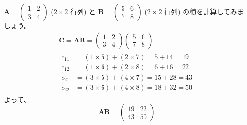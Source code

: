 \begin{ex} \label{matrix_product_example}
$\bm{A} = \begin{pmatrix} 1 & 2 \\ 3 & 4 \end{pmatrix}$ ($2 \times 2$ 行列) と $\bm{B} = \begin{pmatrix} 5 & 6 \\ 7 & 8 \end{pmatrix}$ ($2 \times 2$ 行列) の積を計算してみましょう。
\begin{gather*}
\bm{C} = \bm{A}\bm{B} = \begin{pmatrix} 1 & 2 \\ 3 & 4 \end{pmatrix} \begin{pmatrix} 5 & 6 \\ 7 & 8 \end{pmatrix}\\
\begin{aligned}
c_{11} &= (1 \times 5) + (2 \times 7) = 5 + 14 = 19\\
c_{12} &= (1 \times 6) + (2 \times 8) = 6 + 16 = 22\\
c_{21} &= (3 \times 5) + (4 \times 7) = 15 + 28 = 43\\
c_{22} &= (3 \times 6) + (4 \times 8) = 18 + 32 = 50
\end{aligned}
\end{gather*}
よって、
\[\bm{A}\bm{B} = \begin{pmatrix} 19 & 22 \\ 43 & 50 \end{pmatrix}\]
\end{ex}


